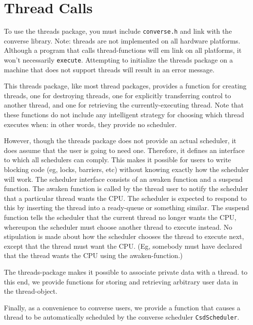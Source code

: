 \section{Thread Calls}

To use the threads package, you must include {\tt converse.h} and link
with the converse library.  Note: threads are not implemented on all
hardware platforms.  Although a program that calls thread-functions
will {em link} on all platforms, it won't necessarily {\tt execute}.
Attempting to initialize the threads package on a machine that does
not support threads will result in an error message.

This threads package, like most thread packages, provides a function
for creating threads, one for destroying threads, one for explicitly
transferring control to another thread, and one for retrieving the
currently-executing thread.  Note that these functions do not include
any intelligent strategy for choosing which thread executes when: in
other words, they provide no scheduler.

However, though the threads package does not provide an actual
scheduler, it does assume that the user is going to need one.
Therefore, it defines an interface to which all schedulers can comply.
This makes it possible for users to write blocking code (eg, locks,
barriers, etc) without knowing exactly how the scheduler will work.
The scheduler interface consists of an awaken function and a suspend
function.  The awaken function is called by the thread user to notify
the scheduler that a particular thread wants the CPU.  The scheduler
is expected to respond to this by inserting the thread into a
ready-queue or something similar.  The suspend function tells the
scheduler that the current thread no longer wants the CPU, whereupon
the scheduler must choose another thread to execute instead.  No
stipulation is made about how the scheduler chooses the thread to
execute next, except that the thread must want the CPU. (Eg, somebody
must have declared that the thread wants the CPU using the
awaken-function.)

The threads-package makes it possible to associate private data
with a thread.  to this end, we provide functions for storing and
retrieving arbitrary user data in the thread-object.

Finally, as a convenience to converse users, we provide a function
that causes a thread to be automatically scheduled by the converse
scheduler {\tt CsdScheduler}.


